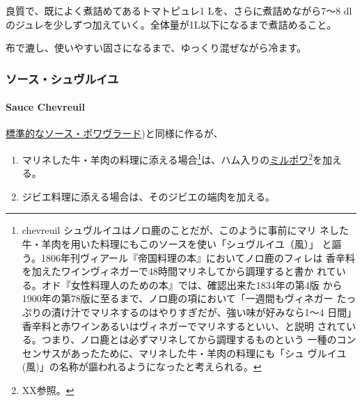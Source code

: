
良質で、既によく煮詰めてあるトマトピュレ1 Lを、さらに煮詰めながら7〜8
dlのジュレを少しずつ加えていく。全体量が1L以下になるまで煮詰めること。

布で漉し、使いやすい固さになるまで、ゆっくり混ぜながら冷ます。

\maeaki

\hypertarget{ux30bdux30fcux30b9ux30b7ux30e5ux30f4ux30ebux30a4ux30e6}{%
\subsubsection{ソース・シュヴルイユ}\label{ux30bdux30fcux30b9ux30b7ux30e5ux30f4ux30ebux30a4ux30e6}}

\hypertarget{sauce-chevreuil}{%
\paragraph{Sauce Chevreuil}\label{sauce-chevreuil}}


\protect\hyperlink{sauce-poivrade}{標準的なソース・ポワヴラード})と同様に作るが、

\begin{enumerate}
\def\labelenumi{\arabic{enumi}.}
\item
  マリネした牛・羊肉の料理に添える場合\footnote{chevreuil
    シュヴルイユはノロ鹿のことだが、このように事前にマリ
    ネした牛・羊肉を用いた料理にもこのソースを使い「シュヴルイユ（風）」
    と謳う。1806年刊ヴィアール『帝国料理の本』においてノロ鹿のフィレは
    香辛料を加えたワインヴィネガーで48時間マリネしてから調理すると書か
    れている。オド『女性料理人のための本』では、確認出来た1834年の第4版
    から1900年の第78版に至るまで、ノロ鹿の項において「一週間もヴィネガー
    たっぷりの漬け汁でマリネするのはやりすぎだが、強い味が好みなら1〜4
    日間」香辛料と赤ワインあるいはヴィネガーでマリネするといい、と説明
    されている。つまり、ノロ鹿とは必ずマリネしてから調理するものという
    一種のコンセンサスがあったために、マリネした牛・羊肉の料理にも「シュ
    ヴルイユ(風)」の名称が謳われるようになったと考えられる。}は、ハム入りの\protect\hyperlink{mirepoix}{ミルポワ}\footnote{XX参照。}を加える。
\item
  ジビエ料理に添える場合は、そのジビエの端肉を加える。
\end{enumerate}

